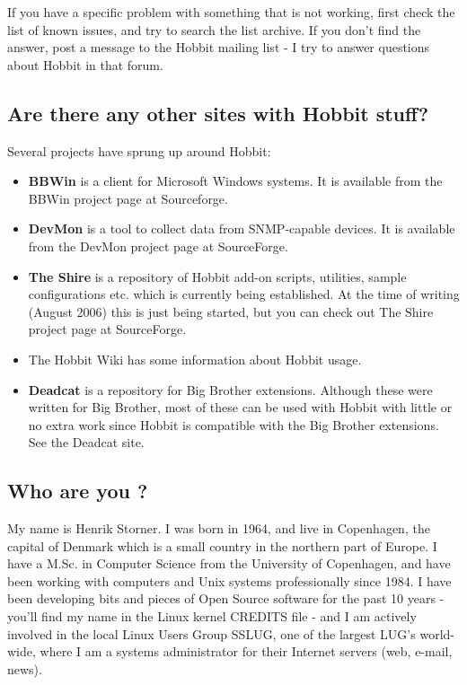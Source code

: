  If you have a specific problem with something that is not working, first check the list of known issues, and try to search the list archive. If you don't find the answer, post a message to the Hobbit mailing list - I try to answer questions about Hobbit in that forum.
\subsection{Are there any other sites with Hobbit stuff?}


 Several projects have sprung up around Hobbit:
\begin{itemize}
\item \textbf{BBWin}
 is a client for Microsoft Windows systems. It is available from the BBWin project page at Sourceforge.
\item \textbf{DevMon}
 is a tool to collect data from SNMP-capable devices. It is available from the DevMon project page at SourceForge.
\item \textbf{The Shire}
 is a repository of Hobbit add-on scripts, utilities, sample configurations etc. which is currently being established. At the time of writing (August 2006) this is just being started, but you can check out The Shire project page at SourceForge.
\item The Hobbit Wiki has some information about Hobbit usage.
\item \textbf{Deadcat}
 is a repository for Big Brother extensions. Although these were written for Big Brother, most of these can be used with Hobbit with little or no extra work since Hobbit is compatible with the Big Brother extensions. See the Deadcat site.

\end{itemize}

\subsection{Who are you ?}


 My name is Henrik Storner. I was born in 1964, and live in
 Copenhagen, the capital of Denmark which is a small country in the
 northern part of Europe. I have a M.Sc. in Computer Science from the
 University of Copenhagen, and have been working with computers and
 Unix systems professionally since 1984. I have been developing bits
 and pieces of Open Source software for the past 10 years - you'll
 find my name in the Linux kernel CREDITS file - and I am actively
 involved in the local Linux Users Group SSLUG, one of the largest
 LUG's world-wide, where I am a systems administrator for their
 Internet servers (web, e-mail, news).



